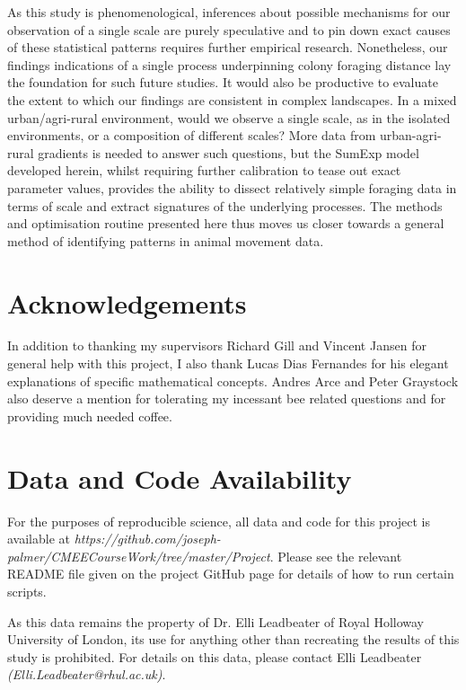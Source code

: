 \documentclass[11pt,usenames,dvipsnames,a4paper]{article}
\begin{document}
\begin{linenumbers}
As this study is phenomenological, inferences about possible mechanisms for our observation of a single scale are purely speculative and to pin down exact causes of these statistical patterns requires further empirical research. Nonetheless, our findings indications of a single process underpinning colony foraging distance lay the foundation for such future studies. It would also be productive to evaluate the extent to which our findings are consistent in complex landscapes. In a mixed urban/agri-rural environment, would we observe a single scale, as in the isolated environments, or a composition of different scales? More data from urban-agri-rural gradients is needed to answer such questions, but the SumExp model developed herein, whilst requiring further calibration to tease out exact parameter values, provides the ability to dissect relatively simple foraging data in terms of scale and extract signatures of the underlying processes. The methods and optimisation routine presented here thus moves us closer towards a general method of identifying patterns in animal movement data.
\end{linenumbers}

\section{Acknowledgements}

In addition to thanking my supervisors Richard Gill and Vincent Jansen for general help with this project, I also thank Lucas Dias Fernandes for his elegant explanations of specific mathematical concepts. Andres Arce and Peter Graystock also deserve a mention for tolerating my incessant bee related questions and for providing much needed coffee.

\newpage
\section{Data and Code Availability}
For the purposes of reproducible science, all data and code for this project is available at \textit{https://github.com/joseph-palmer/CMEECourseWork/tree/master/Project}. Please see the relevant README file given on the project GitHub page for details of how to run certain scripts.

As this data remains the property of Dr. Elli Leadbeater of Royal Holloway University of London, its use for anything other than recreating the results of this study is prohibited. For details on this data, please contact Elli Leadbeater \textit{(Elli.Leadbeater@rhul.ac.uk)}.

\newpage



\end{document}

